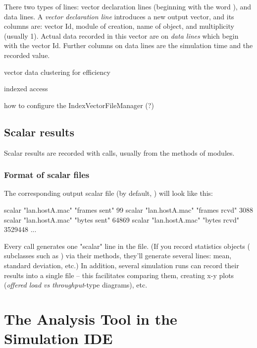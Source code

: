 There two types of lines: vector declaration lines (beginning with
the word ), and data lines.
A \textit{vector declaration line} introduces a new output vector, and
its columns are: vector Id, module of creation, name of 
object, and multiplicity (usually 1). Actual data recorded in this
vector are on \textit{data lines} which begin with the vector Id.
Further columns on data lines are the simulation time and the recorded value.

vector data clustering for efficiency

indexed access

how to configure the IndexVectorFileManager (?)


\subsection{Scalar results}
\label{sec:ch-ana-sim:output-scalars}

Scalar results are recorded with  calls,
usually from the  methods of modules.


\subsubsection{Format of scalar files}

The corresponding output scalar file (by default, )
will look like this:

\begin{filelisting}
scalar "lan.hostA.mac" "frames sent"                99
scalar "lan.hostA.mac" "frames rcvd"                3088
scalar "lan.hostA.mac" "bytes sent"                 64869
scalar "lan.hostA.mac" "bytes rcvd"                 3529448
...
\end{filelisting}

Every  call generates one "scalar" line in the file.
(If you record statistics objects ( subclasses
such as ) via their  methods,
they'll generate several lines: mean, standard deviation, etc.)
In addition, several simulation runs can record their results into a single file --
this facilitates comparing them, creating x-y plots
(\textit{offered load vs throughput}-type diagrams), etc.



\section{The Analysis Tool in the Simulation IDE}

